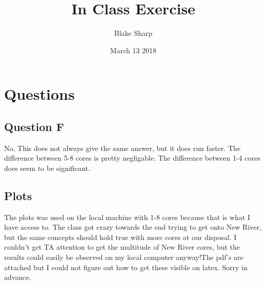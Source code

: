\documentclass{article}
\title{In Class Exercise}
\author{Blake Sharp}
\date{March 13 2018}
\begin{document}

\maketitle %


\section{Questions}

\subsection{Question F}
No, This does not always give the same answer, but it does run faster. The difference between 5-8 cores is pretty negligable. The difference between 1-4 cores does seem to be significant.
\subsection{Plots}
The plots was used on the local machine with 1-8 cores because that is what I have access to. The class got crazy towards the end trying to get onto New River, but the same concepts should hold true with more cores at our disposal. I couldn't get TA attention to get the multitude of New River cores, but the results could easily be observed on my local computer anyway!The pdf's are attached but I could not figure out how to get these visible on latex. Sorry in advance. 
\end{document}

